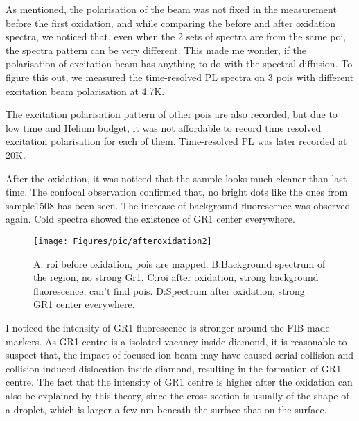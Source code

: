 As mentioned, the polarisation of the beam was not fixed in the measurement before the first oxidation, and while comparing the before and after oxidation spectra, we noticed that, even when the 2 sets of spectra are from the same poi, the spectra pattern can be very different. This made me wonder, if the polarisation of excitation beam has anything to do with the spectral diffusion. To figure this out, we measured the time-resolved PL spectra on 3 pois with different excitation beam polarisation at 4.7K.

The excitation polarisation pattern of other pois are also recorded, but due to low time and Helium budget, it was not affordable to record time resolved excitation polarisation for each of them. Time-resolved PL was later recorded at 20K.

After the oxidation, it was noticed that the sample looks much cleaner than last time. The confocal observation confirmed that, no bright dots like the ones from sample1508 has been seen. The increase of background fluorescence was observed again. Cold spectra showed the existence of GR1 center everywhere.

\begin{figure}[h]
\centering
\texttt{[image: Figures/pic/afteroxidation2]}
\caption{A: roi before oxidation, pois are mapped. B:Background spectrum of the region, no strong Gr1. C:roi after oxidation, strong background fluorescence, can't find pois. D:Spectrum after oxidation, strong GR1 center everywhere.}
\label{fig:wp20160921204221proli}
\end{figure}

I noticed the intensity of GR1 fluorescence is stronger around the FIB made markers. As GR1 centre is a isolated vacancy inside diamond, it is reasonable to suspect that, the impact of focused ion beam may have caused serial collision and collision-induced dislocation inside diamond, resulting in the formation of GR1 centre. The fact that the intensity of GR1 centre is higher after the oxidation can also be explained by this theory, since the cross section is usually of the shape of a droplet, which is larger a few nm beneath the surface that on the surface.


